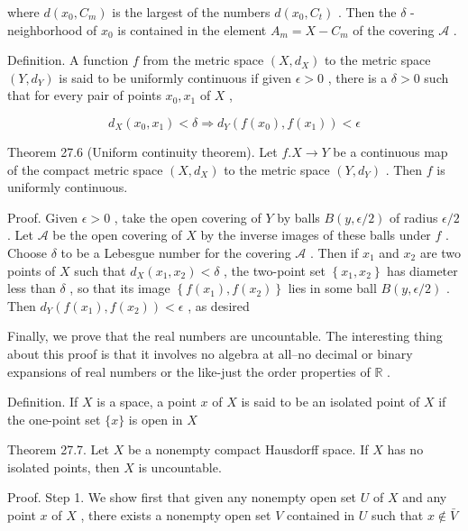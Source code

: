 \documentclass[10pt]{article}
\begin{document}
where \(d\left( {{x}_{0},{C}_{m}}\right)\) is the largest of the numbers \(d\left( {{x}_{0},{C}_{t}}\right)\) . Then the \(\delta\) -neighborhood of \({x}_{0}\) is contained in the element \({A}_{m} = X - {C}_{m}\) of the covering \(\mathcal{A}\) .

Definition. A function \(f\) from the metric space \(\left( {X,{d}_{X}}\right)\) to the metric space \(\left( {Y,{d}_{Y}}\right)\) is said to be uniformly continuous if given \(\epsilon  > 0\) , there is a \(\delta  > 0\) such that for every pair of points \({x}_{0},{x}_{1}\) of \(X\) ,

\[
{d}_{X}\left( {{x}_{0},{x}_{1}}\right)  < \delta  \Rightarrow  {d}_{Y}\left( {f\left( {x}_{0}\right) ,f\left( {x}_{1}\right) }\right)  < \epsilon
\]

Theorem 27.6 (Uniform continuity theorem). Let \(f.X \rightarrow  Y\) be a continuous map of the compact metric space \(\left( {X,{d}_{X}}\right)\) to the metric space \(\left( {Y,{d}_{Y}}\right)\) . Then \(f\) is uniformly continuous.

Proof. Given \(\epsilon  > 0\) , take the open covering of \(Y\) by balls \(B\left( {y,\epsilon /2}\right)\) of radius \(\epsilon /2\) . Let \(\mathcal{A}\) be the open covering of \(X\) by the inverse images of these balls under \(f\) . Choose \(\delta\) to be a Lebesgue number for the covering \(\mathcal{A}\) . Then if \({x}_{1}\) and \({x}_{2}\) are two points of \(X\) such that \({d}_{X}\left( {{x}_{1},{x}_{2}}\right)  < \delta\) , the two-point set \(\left\{  {{x}_{1},{x}_{2}}\right\}\) has diameter less than \(\delta\) , so that its image \(\left\{  {f\left( {x}_{1}\right) ,f\left( {x}_{2}\right) }\right\}\) lies in some ball \(B\left( {y,\epsilon /2}\right)\) . Then \({d}_{Y}\left( {f\left( {x}_{1}\right) ,f\left( {x}_{2}\right) }\right)  < \epsilon\) , as desired

Finally, we prove that the real numbers are uncountable. The interesting thing about this proof is that it involves no algebra at all--no decimal or binary expansions of real numbers or the like-just the order properties of \(\mathbb{R}\) .

Definition. If \(X\) is a space, a point \(x\) of \(X\) is said to be an isolated point of \(X\) if the one-point set \(\{ x\}\) is open in \(X\)

Theorem 27.7. Let \(X\) be a nonempty compact Hausdorff space. If \(X\) has no isolated points, then \(X\) is uncountable.

Proof. Step 1. We show first that given any nonempty open set \(U\) of \(X\) and any point \(x\) of \(X\) , there exists a nonempty open set \(V\) contained in \(U\) such that \(x \notin  \bar{V}\)
\end{document}

